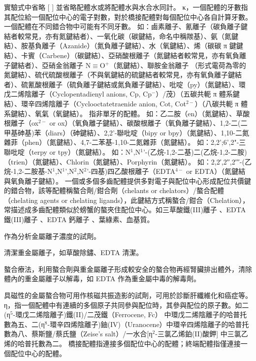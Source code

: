 \documentclass[a4paper,12pt]{report}
\begin{document}
實驗式中省略 [ ] 並省略配體水或將配體水與水合水同計。
κ，一個配體的牙數指其配位給一個配位中心的電子對數，對於橋接配體對每個配位中心各自計算牙數。一個配體在不同錯合物中可能有不同牙數。
如：鹵素離子、氰離子（碳負離子鍵結者較常見，亦有氮鍵結者）、一氧化碳（碳鍵結，命名中稱羰基）、氨（氮鍵結）、胺基負離子（Azanide）（氮負離子鍵結）、水（氧鍵結）、烯（碳碳 π 鍵鍵結）、卡賓（Carbene）（碳鍵結）、亞硝酸根離子（氮鍵結者較常見，亦有氧負離子鍵結者）、亞硝金翁離子 N$\equiv$O$^+$（氮鍵結）、聯胺金翁離子 （形式電荷為零的氮鍵結）、硫代硫酸根離子（不與氧鍵結的硫鍵結者較常見，亦有氧負離子鍵結者）、硫氰酸根離子（硫負離子鍵結或氮負離子鍵結）、吡啶（py）（氮鍵結）、環戊二烯陰離子（Cyclopentadienyl anions, Cp, Cp$^-$）/茂）（五碳共軛 π 體系鍵結）、環辛四烯陰離子（Cyclooctatetraenide anion, Cot, Cot$^{2-}$）（八碳共軛 π 體系鍵結）、氧氣（氧鍵結）。
指非單牙的配體。
如：乙二胺（en）（氮鍵結）、草酸根離子（ox$^{2-}$ or ox）（氧負離子鍵結）、碳酸根離子（氧負離子鍵結）、1,2-二(二甲基砷基)苯（diars）（砷鍵結）、2,2'-聯吡啶（bipy or bpy）（氮鍵結）、1,10-二氮雜菲（phen）（氮鍵結）、4,7-二苯基-1,10-二氮雜菲（氮鍵結）。
如：2,2';6',2"-三聯吡啶（terpy or tpy）（氮鍵結）。
如：N$^1$,N$^1$'-(乙烷-1,2-二基)二(乙烷-1,2-二胺)（trien）（氮鍵結）、Chlorin（氮鍵結）、Porphyrin（氮鍵結）。
如：2,2′,2′′,2′′′-(乙烷-1,2-二胺基-N$^1$,N$^1$',N$^2$,N$^2$'-四基)四乙酸根離子（EDTA$^{4-}$ or EDTA）（氮鍵結與氧負離子鍵結）。
一個或多個多齒配體提供多對電子與配位中心形成配位共價鍵的錯合物，該等配體稱螯合劑/鉗合劑（chelants or chelators）/螯合配體（chelating agents or chelating ligands），此鍵結方式稱螯合/鉗合（Chelation），常描述成多齒配體類似於螃蟹的螯夾住配位中心。如三草酸鐵(III)離子 、EDTA 鐵(III)離子 \ce{[Fe(EDTA)]-}、EDTA 鈣離子 、葉綠素、血基質。
\bit
\item 作為分析金屬離子濃度的試劑。
\item 清潔重金屬離子，如草酸除鏽、EDTA 清潔。
\item 螯合療法，利用螯合劑與重金屬離子形成較安全的螯合物再經腎臟排出體外，清除體內的重金屬離子以解毒，如 EDTA 作為重金屬中毒的解毒劑。
\item 具磁性的金屬螯合物可用作核磁共振造影的試劑，可用於診斷肝纖維化和癌症等。
\eit
{}
η，指一個配體中有連續的多個原子共同參與配位時，其參與配位的原子數。如二(η$^5$-環戊二烯陰離子)鐵(II)/二茂鐵（Ferrocene, Fc）  中環戊二烯陰離子的哈普托數為五、二(η$^8$-環辛四烯陰離子)鈾(IV)（Uranocene）中環辛四烯陰離子的哈普托數為八、蔡斯鹽/蔡氏鹽（Zeise's salt）/一水合[η$^2$-三氯乙烯鉑(II)酸鉀]  中三氯乙烯的哈普托數為二。
橋接配體指連接多個配位中心的配體；終端配體指僅連接一個配位中心的配體。
\end{document}
